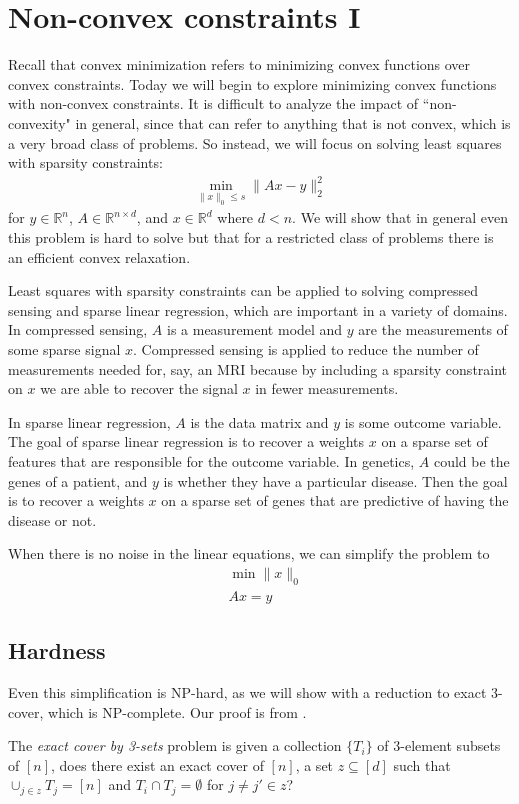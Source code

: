 \section{Non-convex constraints I}
Recall that convex minimization refers to minimizing convex functions over convex constraints. Today we will begin to explore minimizing convex functions with non-convex constraints. It is difficult to analyze the impact of ``non-convexity" in general, since that can refer to anything that is not convex, which is a very broad class of problems. So instead, we will focus on solving least squares with sparsity constraints:
\begin{align*}
    \min_{\|x\|_0 \leq s} \|Ax-y\|^2_2
\end{align*}
for $y \in \mathbb{R}^{n}$, $A \in \mathbb{R}^{n \times d}$, and $x \in \mathbb{R}^{d}$ where $d < n$. We will show that in general even this problem is hard to solve but that for a restricted class of problems there is an efficient convex relaxation.

Least squares with sparsity constraints can be applied to solving compressed sensing and sparse linear regression, which are important in a variety of domains. In compressed sensing, $A$ is a measurement model and $y$ are the measurements of some sparse signal $x$. Compressed sensing is applied to reduce the number of measurements needed for, say, an MRI because by including a sparsity constraint on $x$ we are able to recover the signal $x$ in fewer measurements.

In sparse linear regression, $A$ is the data matrix and $y$ is some outcome variable. The goal of sparse linear regression is to recover a weights $x$ on a sparse set of features that are responsible for the outcome variable. In genetics, $A$ could be the genes of a patient, and $y$ is whether they have a particular disease. Then the goal is to recover a weights $x$ on a sparse set of genes that are predictive of having the disease or not.

When there is no noise in the linear equations, we can simplify the problem to
\begin{align*}
    & \min \|x\|_0 \\
    &  Ax = y
\end{align*}

\subsection{Hardness}
Even this simplification is NP-hard, as we will show with a reduction to exact 3-cover, which is NP-complete. Our proof is from \cite{foucart2013mathematical}.
\begin{definition}
The \textit{exact cover by 3-sets} problem is given a collection $\{T_i\}$ of 3-element subsets of $[n]$, does there exist an exact cover of $[n]$, a set $z \subseteq [d]$ such that $\cup_{j \in z} T_j = [n]$ and $T_i \cap T_j = \emptyset$ for $j \neq j' \in z$?
\end{definition}

